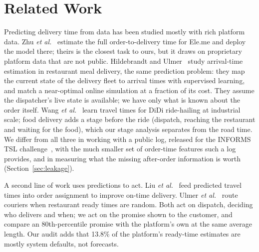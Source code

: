 \section{Related Work}

Predicting delivery time from data has been studied mostly with rich platform data. Zhu
\textit{et al.}~\cite{zhu2020fulfillment} estimate the full order-to-delivery time for Ele.me and deploy
the model there; theirs is the closest task to ours, but it draws on proprietary platform data that are
not public. Hildebrandt and Ulmer~\cite{hildebrandt2022supervised} study arrival-time estimation in
restaurant meal delivery, the same prediction problem: they map the current state of the delivery fleet
to arrival times with supervised learning, and match a near-optimal online simulation at a fraction of its
cost. They assume the dispatcher's live state is available; we have only what is known about the order
itself. Wang
\textit{et al.}~\cite{wang2018travel} learn travel times for DiDi ride-hailing at industrial scale; food
delivery adds a stage before the ride (dispatch, reaching the restaurant and waiting for the food), which
our stage analysis separates from the road time. We differ from all three in working with a public log,
released for the INFORMS TSL challenge~\cite{zhao2024meituan}, with the much smaller set of order-time
features such a log provides, and in measuring what the missing after-order information is worth
(Section~\ref{sec:leakage}).

A second line of work uses predictions to act. Liu \textit{et al.}~\cite{liu2021ontime} feed predicted
travel times into order assignment to improve on-time delivery. Ulmer \textit{et al.}~\cite{ulmer2021restaurant}
route couriers when restaurant ready times are random. Both act on dispatch, deciding who delivers and
when; we act on the promise shown to the customer, and compare an 80th-percentile promise with the
platform's own at the same average length. Our audit adds that 13.8\% of the platform's ready-time
estimates are mostly system defaults, not forecasts.

